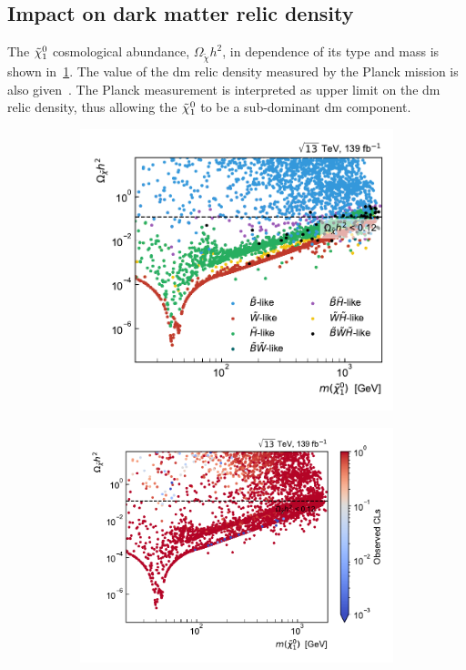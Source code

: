 \subsection{Impact on dark matter relic density}

The $\tilde{\chi}_1^0$ cosmological abundance, $\Omega_{\tilde{\chi}} h^2$, in dependence of its type and mass is shown in~\cref{fig:relic_density_lsp}. The value of the \gls{dm} relic density measured by the Planck mission is also given~\cite{Planck}. The Planck measurement is interpreted as upper limit on the \gls{dm} relic density, thus allowing the $\tilde{\chi}_1^0$ to be a sub-dominant \gls{dm} component.

 \begin{figure}
	\centering
	\begin{subfigure}[b]{0.45\linewidth}
		\centering\includegraphics[width=\textwidth]{scatter/relic_density_lsp}
		\caption{\label{fig:relic_density_lsp}}
	\end{subfigure}\hfill
	\begin{subfigure}[b]{0.55\linewidth}
		\centering\includegraphics[width=\textwidth]{scatter/relic_density_lsp_cls}

\end{subfigure}
\end{figure}
